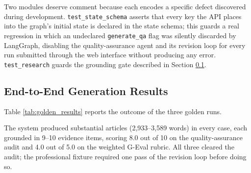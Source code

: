 Two modules deserve comment because each encodes a specific defect discovered
during development. \texttt{test\_state\_schema} asserts that every key the API
places into the graph's initial state is declared in the state schema; this
guards a real regression in which an undeclared \texttt{generate\_qa} flag was
silently discarded by LangGraph, disabling the quality-assurance agent and its
revision loop for every run submitted through the web interface without
producing any error. \texttt{test\_research} guards the grounding gate described
in Section \ref{sec:results_e2e}.

\subsection{End-to-End Generation Results}
\label{sec:results_e2e}

Table \ref{tab:golden_results} reports the outcome of the three golden runs.

\begin{table}[ht]
    \centering
    \renewcommand{\arraystretch}{1.3}
    \caption{End-to-end pipeline results. QA is scored 0--10, G-Eval 1.0--5.0.
             Writer and judge model: \texttt{gpt-5-mini}.}
    \label{tab:golden_results}
\end{table}

The system produced substantial articles (2,933--3,589 words) in every case,
each grounded in 9--10 evidence items, scoring 8.0 out of 10 on the
quality-assurance audit and 4.0 out of 5.0 on the weighted G-Eval rubric. All
three cleared the audit; the professional fixture required one pass of the
revision loop before doing so.

